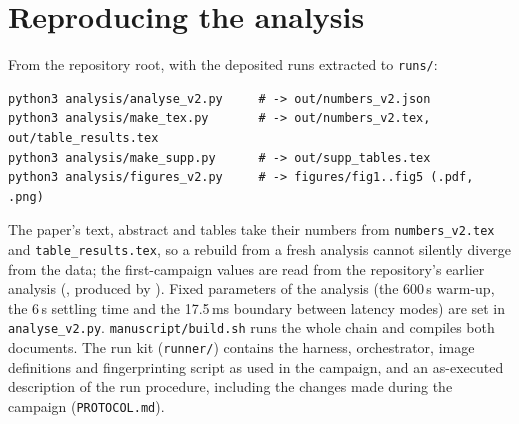 \documentclass[10pt]{article}
\begin{document}
\section{Reproducing the analysis}
From the repository root, with the deposited runs extracted to \texttt{runs/}:
\begin{verbatim}
python3 analysis/analyse_v2.py     # -> out/numbers_v2.json
python3 analysis/make_tex.py       # -> out/numbers_v2.tex, out/table_results.tex
python3 analysis/make_supp.py      # -> out/supp_tables.tex
python3 analysis/figures_v2.py     # -> figures/fig1..fig5 (.pdf, .png)
\end{verbatim}
The paper's text, abstract and tables take their numbers from \texttt{numbers\_v2.tex} and \texttt{table\_results.tex}, so a rebuild from a fresh analysis cannot silently diverge from the data; the first-campaign values are read from the repository's earlier analysis (, produced by ). Fixed parameters of the analysis (the 600\,s warm-up, the 6\,s settling time and the 17.5\,ms boundary between latency modes) are set in \texttt{analyse\_v2.py}. \texttt{manuscript/build.sh} runs the whole chain and compiles both documents. The run kit (\texttt{runner/}) contains the harness, orchestrator, image definitions and fingerprinting script as used in the campaign, and an as-executed description of the run procedure, including the changes made during the campaign (\texttt{PROTOCOL.md}).
\end{document}

